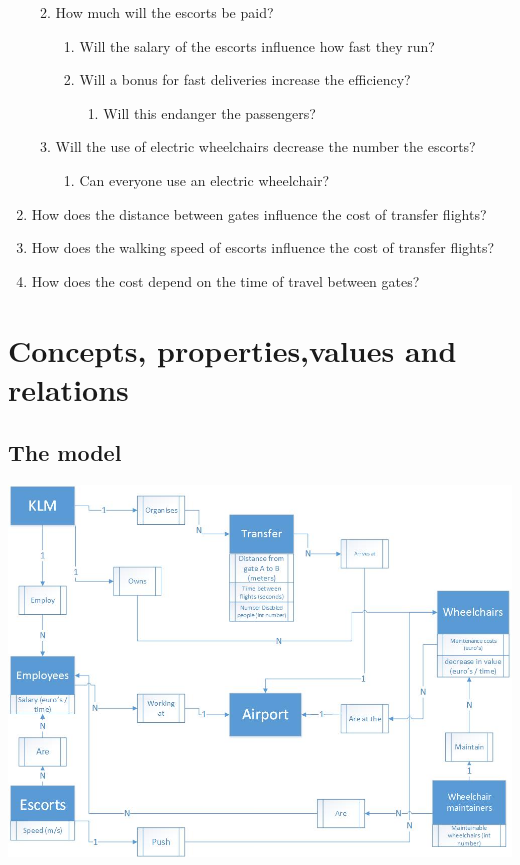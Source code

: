 \documentclass[a4paper, 11pt, notitlepage]{report}
\begin{document}
\begin{enumerate}
\begin{enumerate}
\begin{enumerate}
		\end{enumerate}
	\item How much will the escorts be paid?
		\begin{enumerate}
		\item Will the salary of the escorts influence how fast they run?
		\item Will a bonus for fast deliveries increase the efficiency?
			\begin{enumerate}
			\item Will this endanger the passengers?
			\end{enumerate}
		\end{enumerate}
	\item Will the use of electric wheelchairs decrease the number the escorts?
		\begin{enumerate}
			\item Can everyone use an electric wheelchair?
		\end{enumerate}
	\end{enumerate}
		
\item How does the distance between gates influence the cost of transfer flights?
\item How does the walking speed of escorts influence the cost of transfer flights?
\item How does the cost depend on the time of travel between gates?
\end{enumerate}
\clearpage



\setcounter{chapter}{+8}
\chapter{Concepts, properties,values and relations}

\section{The model}
\includegraphics[scale=0.5]{figures/Conceptualmodel.jpg}
\clearpage
\end{document}
